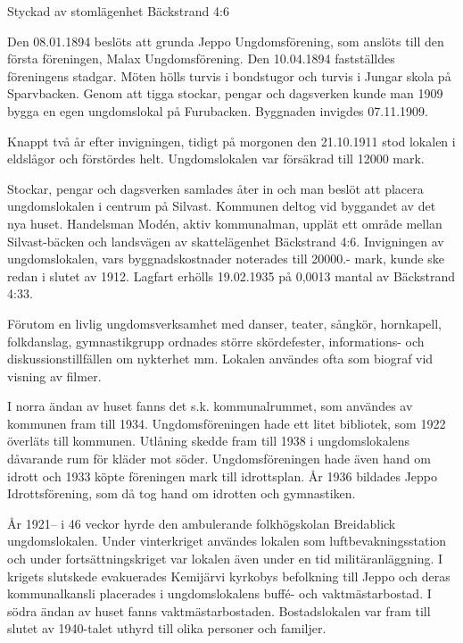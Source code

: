
Styckad av stomlägenhet Bäckstrand 4:6



Den 08.01.1894 beslöts att grunda Jeppo Ungdomsförening, som anslöts till den första föreningen, Malax Ungdomsförening. Den 10.04.1894 fastställdes föreningens stadgar. Möten hölls turvis i bondstugor och turvis i Jungar skola på Sparvbacken. Genom att tigga stockar, pengar och dagsverken kunde man 1909 bygga en egen ungdomslokal på Furubacken. Byggnaden invigdes 07.11.1909.


Knappt två år efter invigningen, tidigt på morgonen den 21.10.1911 stod lokalen i eldslågor och förstördes helt. Ungdomslokalen var försäkrad till 12000 mark.

Stockar, pengar och dagsverken samlades åter in och man beslöt att placera ungdomslokalen i centrum på Silvast. Kommunen deltog vid byggandet av det nya huset. Handelsman Modén, aktiv kommunalman, upplät ett område mellan Silvast-bäcken och landsvägen av skattelägenhet Bäckstrand 4:6. Invigningen av ungdomslokalen, vars byggnadskostnader noterades till 20000.- mark, kunde ske redan i slutet av 1912. Lagfart erhölls 19.02.1935 på 0,0013 mantal av Bäckstrand 4:33.

Förutom en livlig ungdomsverksamhet med danser, teater, sångkör, hornkapell, folkdanslag, gymnastikgrupp ordnades större skördefester, informations- och diskussionstillfällen om nykterhet mm. Lokalen användes ofta som biograf vid visning av filmer.

I norra ändan av huset fanns det s.k. kommunalrummet, som användes av kommunen fram till 1934. Ungdomsföreningen hade ett litet bibliotek, som 1922 överläts till kommunen. Utlåning skedde fram till 1938 i ungdomslokalens dåvarande rum för kläder mot söder. Ungdomsföreningen hade även hand om idrott och 1933 köpte föreningen mark till idrottsplan. År 1936 bildades Jeppo Idrottsförening, som då tog hand om idrotten och gymnastiken.

År 1921-- i 46 veckor hyrde den ambulerande folkhögskolan Breidablick ungdomslokalen. Under vinterkriget användes lokalen som luftbevakningsstation och under fortsättningskriget var lokalen även under en tid militäranläggning. I krigets slutskede evakuerades Kemijärvi kyrkobys befolkning till Jeppo och deras kommunalkansli placerades i ungdomslokalens buffé- och vaktmästarbostad. I södra ändan av huset fanns vaktmästarbostaden. Bostadslokalen var fram till slutet av 1940-talet uthyrd till olika personer och familjer.

